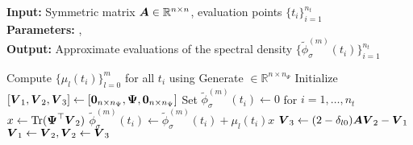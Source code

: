 \hspace*{\algorithmicindent} \textbf{Input:} Symmetric matrix $\boldsymbol{A} \in \mathbb{R}^{n \times n}$, evaluation points $\{t_i\}_{i=1}^{n_t}$ \\
\hspace*{\algorithmicindent} \textbf{Parameters:} ,  \\
\hspace*{\algorithmicindent} \textbf{Output:} Approximate evaluations of the spectral density $\{\widetilde{\phi}_{\sigma}^{(m)}(t_i)\}_{i=1}^{n_t}$
\begin{algorithmic}[1]
    \State Compute $\{\mu_l(t_i)\}_{l=0}^{m}$ for all $t_i$ using 
    \State Generate  $\in \mathbb{R}^{n \times n_{\Psi}}$
    \State Initialize $[\boldsymbol{V}_1, \boldsymbol{V}_2, \boldsymbol{V}_3] \gets [\boldsymbol{0}_{n \times n_{\Psi}}, \boldsymbol{\Psi}, \boldsymbol{0}_{n \times n_{\Psi}}]$
    \State Set $\widetilde{\phi}_{\sigma}^{(m)}(t_i) \gets 0$ for $i=1,\dots,n_t$
      \State $x \gets \operatorname{Tr}(\boldsymbol{\Psi}^{\top} \boldsymbol{V}_2)$ \label{lin:2-chebyshev-fast-trace}
        \State $\widetilde{\phi}_{\sigma}^{(m)}(t_i) \gets \widetilde{\phi}_{\sigma}^{(m)}(t_i) + \mu_l(t_i) x$
      \EndFor
      \State $\boldsymbol{V}_3 \gets (2 - \delta_{l0}) \boldsymbol{A} \boldsymbol{V}_2 - \boldsymbol{V}_1$ 
      \State $\boldsymbol{V}_1 \gets \boldsymbol{V}_2, \boldsymbol{V}_2 \gets \boldsymbol{V}_3$
    \EndFor
\end{algorithmic}
